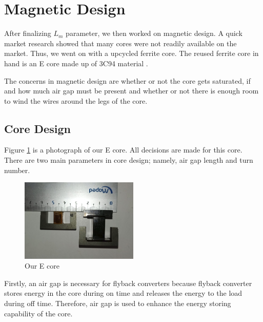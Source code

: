 \documentclass[12pt]{article}
\begin{document}
\newpage    
\section{Magnetic Design}

    After finalizing $L_m$ parameter, we then worked on magnetic design. A quick market research showed that many cores were not readily available on the market. Thus, we went on with a upcycled ferrite core. The reused ferrite core in hand is an E core made up of 3C94 material \cite{core}.
    
    The concerns in magnetic design are whether or not the core gets saturated, if and how much air gap must be present and whether or not there is enough room to wind the wires around the legs of the core.
    \subsection{Core Design}

    Figure \ref{fig:photo of core} is a photograph of our E core. All decisions are made for this core. There are two main parameters in core design; namely, air gap length and turn number.

    \begin{figure}[H]
        \centering
        \includegraphics[width=0.5\textwidth]{img/core.png}
        \caption{Our E core}
        \label{fig:photo of core}
    \end{figure}

    Firstly, an air gap is necessary for flyback converters because flyback converter stores energy in the core during on time and releases the energy to the load during off time. Therefore, air gap is used to enhance the energy storing capability of the core.
\end{document}
